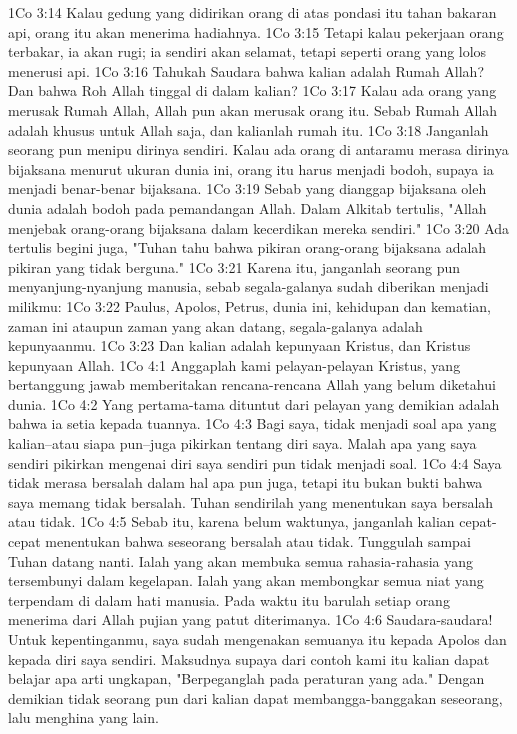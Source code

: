 1Co 3:14  Kalau gedung yang didirikan orang di atas pondasi itu tahan bakaran api, orang itu akan menerima hadiahnya.
1Co 3:15  Tetapi kalau pekerjaan orang terbakar, ia akan rugi; ia sendiri akan selamat, tetapi seperti orang yang lolos menerusi api.
1Co 3:16  Tahukah Saudara bahwa kalian adalah Rumah Allah? Dan bahwa Roh Allah tinggal di dalam kalian?
1Co 3:17  Kalau ada orang yang merusak Rumah Allah, Allah pun akan merusak orang itu. Sebab Rumah Allah adalah khusus untuk Allah saja, dan kalianlah rumah itu.
1Co 3:18  Janganlah seorang pun menipu dirinya sendiri. Kalau ada orang di antaramu merasa dirinya bijaksana menurut ukuran dunia ini, orang itu harus menjadi bodoh, supaya ia menjadi benar-benar bijaksana.
1Co 3:19  Sebab yang dianggap bijaksana oleh dunia adalah bodoh pada pemandangan Allah. Dalam Alkitab tertulis, "Allah menjebak orang-orang bijaksana dalam kecerdikan mereka sendiri."
1Co 3:20  Ada tertulis begini juga, "Tuhan tahu bahwa pikiran orang-orang bijaksana adalah pikiran yang tidak berguna."
1Co 3:21  Karena itu, janganlah seorang pun menyanjung-nyanjung manusia, sebab segala-galanya sudah diberikan menjadi milikmu:
1Co 3:22  Paulus, Apolos, Petrus, dunia ini, kehidupan dan kematian, zaman ini ataupun zaman yang akan datang, segala-galanya adalah kepunyaanmu.
1Co 3:23  Dan kalian adalah kepunyaan Kristus, dan Kristus kepunyaan Allah.
1Co 4:1  Anggaplah kami pelayan-pelayan Kristus, yang bertanggung jawab memberitakan rencana-rencana Allah yang belum diketahui dunia.
1Co 4:2  Yang pertama-tama dituntut dari pelayan yang demikian adalah bahwa ia setia kepada tuannya.
1Co 4:3  Bagi saya, tidak menjadi soal apa yang kalian--atau siapa pun--juga pikirkan tentang diri saya. Malah apa yang saya sendiri pikirkan mengenai diri saya sendiri pun tidak menjadi soal.
1Co 4:4  Saya tidak merasa bersalah dalam hal apa pun juga, tetapi itu bukan bukti bahwa saya memang tidak bersalah. Tuhan sendirilah yang menentukan saya bersalah atau tidak.
1Co 4:5  Sebab itu, karena belum waktunya, janganlah kalian cepat-cepat menentukan bahwa seseorang bersalah atau tidak. Tunggulah sampai Tuhan datang nanti. Ialah yang akan membuka semua rahasia-rahasia yang tersembunyi dalam kegelapan. Ialah yang akan membongkar semua niat yang terpendam di dalam hati manusia. Pada waktu itu barulah setiap orang menerima dari Allah pujian yang patut diterimanya.
1Co 4:6  Saudara-saudara! Untuk kepentinganmu, saya sudah mengenakan semuanya itu kepada Apolos dan kepada diri saya sendiri. Maksudnya supaya dari contoh kami itu kalian dapat belajar apa arti ungkapan, "Berpeganglah pada peraturan yang ada." Dengan demikian tidak seorang pun dari kalian dapat membangga-banggakan seseorang, lalu menghina yang lain.
